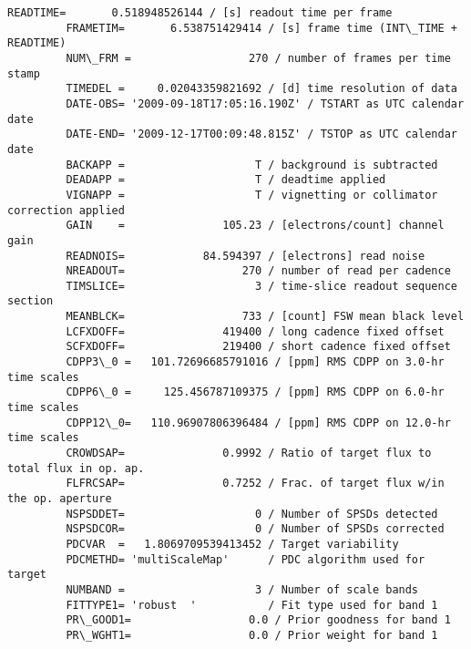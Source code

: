 \documentclass[11pt]{article}
\begin{document}
\begin{Verbatim}[commandchars=\\\{\}]
         READTIME=       0.518948526144 / [s] readout time per frame                     
         FRAMETIM=       6.538751429414 / [s] frame time (INT\_TIME + READTIME)           
         NUM\_FRM =                  270 / number of frames per time stamp                
         TIMEDEL =     0.02043359821692 / [d] time resolution of data                    
         DATE-OBS= '2009-09-18T17:05:16.190Z' / TSTART as UTC calendar date              
         DATE-END= '2009-12-17T00:09:48.815Z' / TSTOP as UTC calendar date               
         BACKAPP =                    T / background is subtracted                       
         DEADAPP =                    T / deadtime applied                               
         VIGNAPP =                    T / vignetting or collimator correction applied    
         GAIN    =               105.23 / [electrons/count] channel gain                 
         READNOIS=            84.594397 / [electrons] read noise                         
         NREADOUT=                  270 / number of read per cadence                     
         TIMSLICE=                    3 / time-slice readout sequence section            
         MEANBLCK=                  733 / [count] FSW mean black level                   
         LCFXDOFF=               419400 / long cadence fixed offset                      
         SCFXDOFF=               219400 / short cadence fixed offset                     
         CDPP3\_0 =   101.72696685791016 / [ppm] RMS CDPP on 3.0-hr time scales           
         CDPP6\_0 =     125.456787109375 / [ppm] RMS CDPP on 6.0-hr time scales           
         CDPP12\_0=   110.96907806396484 / [ppm] RMS CDPP on 12.0-hr time scales          
         CROWDSAP=               0.9992 / Ratio of target flux to total flux in op. ap.  
         FLFRCSAP=               0.7252 / Frac. of target flux w/in the op. aperture     
         NSPSDDET=                    0 / Number of SPSDs detected                       
         NSPSDCOR=                    0 / Number of SPSDs corrected                      
         PDCVAR  =   1.8069709539413452 / Target variability                             
         PDCMETHD= 'multiScaleMap'      / PDC algorithm used for target                  
         NUMBAND =                    3 / Number of scale bands                          
         FITTYPE1= 'robust  '           / Fit type used for band 1                       
         PR\_GOOD1=                  0.0 / Prior goodness for band 1                      
         PR\_WGHT1=                  0.0 / Prior weight for band 1                        

\end{Verbatim}
\end{document}
